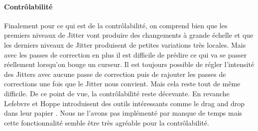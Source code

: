\documentclass[12pt]{article}
\begin{document}
\paragraph{Contrôlabilité}
Finalement pour ce qui est de la contrôlabilité, on comprend bien que les premiers niveaux de Jitter vont produire des changements à grande échelle et que les derniers niveaux de Jitter produisent de petites variations très locales. Mais avec les passes de correction en plus il est difficile de prédire ce qui va se passer réellement lorsqu'on bouge un curseur. Il est toujours possible de régler l'intensité des Jitters avec aucune passe de correction puis de rajouter les passes de corrections une fois que le Jitter nous convient. Mais cela reste tout de même difficile. De ce point de vue, la contrôlabilité reste décevante. En revanche Lefebvre et Hoppe introduisent des outils intéressants comme le drag and drop dans leur papier \cite{Lef++}. Nous ne l'avons pas implémenté par manque de temps mais cette fonctionnalité semble être très agréable pour la contrôlabilité.
\end{document}
